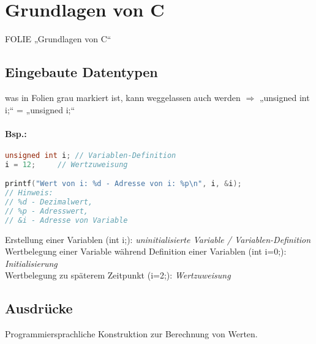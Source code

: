 \section{Grundlagen von C}

FOLIE „Grundlagen von C“

\subsection{Eingebaute Datentypen}
was in Folien grau markiert ist, kann weggelassen auch werden $\Rightarrow$ „unsigned int i;“ = „unsigned i;“

\paragraph{Bsp.:}

\begin{lstlisting}[language=C]
unsigned int i;	// Variablen-Definition
i = 12;		// Wertzuweisung

printf("Wert von i: %d - Adresse von i: %p\n", i, &i);
// Hinweis: 
// %d - Dezimalwert, 
// %p - Adresswert, 
// &i - Adresse von Variable
\end{lstlisting}
Erstellung einer Variablen (int i;): \emph{uninitialisierte Variable / Variablen-Definition}\\
Wertbelegung einer Variable während Definition einer Variablen (int i=0;): \emph{Initialisierung}\\
Wertbelegung zu späterem Zeitpunkt (i=2;): \emph{Wertzuweisung}

\subsection{Ausdrücke}
Programmiersprachliche Konstruktion zur Berechnung von Werten.
